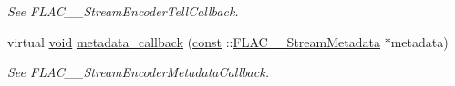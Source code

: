\begin{DoxyCompactItemize}
\begin{DoxyCompactList}\small\item\em See F\+L\+A\+C\+\_\+\+\_\+\+Stream\+Encoder\+Tell\+Callback. \end{DoxyCompactList}\item 
virtual \hyperlink{sound_8c_ae35f5844602719cf66324f4de2a658b3}{void} \hyperlink{class_f_l_a_c_1_1_encoder_1_1_stream_affc9c53d8b6e0cfcb3bc85255e0bf1ac}{metadata\+\_\+callback} (\hyperlink{getopt1_8c_a2c212835823e3c54a8ab6d95c652660e}{const} \+::\hyperlink{struct_f_l_a_c_____stream_metadata}{F\+L\+A\+C\+\_\+\+\_\+\+Stream\+Metadata} $\ast$metadata)
\begin{DoxyCompactList}\small\item\em See F\+L\+A\+C\+\_\+\+\_\+\+Stream\+Encoder\+Metadata\+Callback. \end{DoxyCompactList}\end{DoxyCompactItemize}
